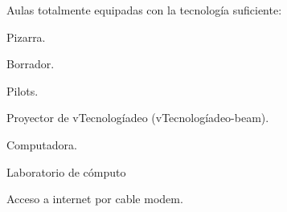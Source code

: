 \begin{syllabus}
\begin{didactical-resources}
Aulas totalmente equipadas con la tecnología suficiente:

\begin{inparaenum}[ \bf I:]
\item Pizarra.
\item Borrador.
\item Pilots.
\item Proyector de vTecnologíadeo (vTecnologíadeo-beam).
\item Computadora.
\item Laboratorio de cómputo
\item Acceso a internet por cable modem.
\end{inparaenum}

\end{didactical-resources}


\begin{coursebibliography}
\end{coursebibliography}

\end{syllabus}

